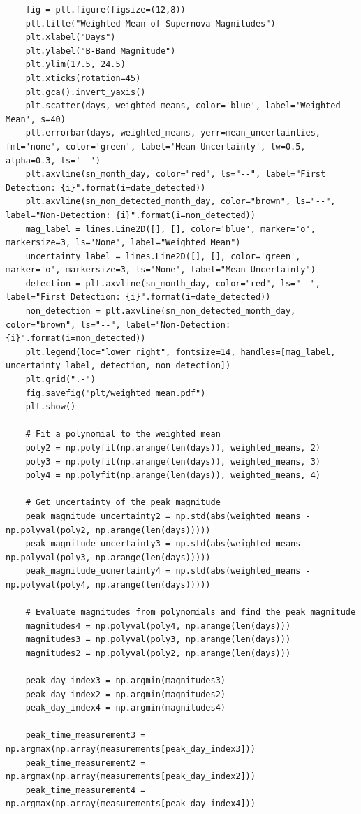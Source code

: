 \documentclass{article}
\begin{document}
\begin{appendices}
\begin{verbatim}
    fig = plt.figure(figsize=(12,8))
    plt.title("Weighted Mean of Supernova Magnitudes")
    plt.xlabel("Days")
    plt.ylabel("B-Band Magnitude")
    plt.ylim(17.5, 24.5)
    plt.xticks(rotation=45)
    plt.gca().invert_yaxis()
    plt.scatter(days, weighted_means, color='blue', label='Weighted Mean', s=40)
    plt.errorbar(days, weighted_means, yerr=mean_uncertainties, fmt='none', color='green', label='Mean Uncertainty', lw=0.5, alpha=0.3, ls='--')
    plt.axvline(sn_month_day, color="red", ls="--", label="First Detection: {i}".format(i=date_detected))
    plt.axvline(sn_non_detected_month_day, color="brown", ls="--", label="Non-Detection: {i}".format(i=non_detected))
    mag_label = lines.Line2D([], [], color='blue', marker='o', markersize=3, ls='None', label="Weighted Mean")
    uncertainty_label = lines.Line2D([], [], color='green', marker='o', markersize=3, ls='None', label="Mean Uncertainty")
    detection = plt.axvline(sn_month_day, color="red", ls="--", label="First Detection: {i}".format(i=date_detected))
    non_detection = plt.axvline(sn_non_detected_month_day, color="brown", ls="--", label="Non-Detection: {i}".format(i=non_detected))
    plt.legend(loc="lower right", fontsize=14, handles=[mag_label, uncertainty_label, detection, non_detection])
    plt.grid(".-")
    fig.savefig("plt/weighted_mean.pdf")
    plt.show()
    
    # Fit a polynomial to the weighted mean
    poly2 = np.polyfit(np.arange(len(days)), weighted_means, 2)
    poly3 = np.polyfit(np.arange(len(days)), weighted_means, 3)
    poly4 = np.polyfit(np.arange(len(days)), weighted_means, 4)
    
    # Get uncertainty of the peak magnitude
    peak_magnitude_uncertainty2 = np.std(abs(weighted_means - np.polyval(poly2, np.arange(len(days)))))
    peak_magnitude_uncertainty3 = np.std(abs(weighted_means - np.polyval(poly3, np.arange(len(days)))))
    peak_magnitude_ucnertainty4 = np.std(abs(weighted_means - np.polyval(poly4, np.arange(len(days)))))
    
    # Evaluate magnitudes from polynomials and find the peak magnitude
    magnitudes4 = np.polyval(poly4, np.arange(len(days)))
    magnitudes3 = np.polyval(poly3, np.arange(len(days)))
    magnitudes2 = np.polyval(poly2, np.arange(len(days)))
    
    peak_day_index3 = np.argmin(magnitudes3)
    peak_day_index2 = np.argmin(magnitudes2)
    peak_day_index4 = np.argmin(magnitudes4)
    
    peak_time_measurement3 = np.argmax(np.array(measurements[peak_day_index3]))
    peak_time_measurement2 = np.argmax(np.array(measurements[peak_day_index2]))
    peak_time_measurement4 = np.argmax(np.array(measurements[peak_day_index4]))
    

\end{verbatim}
\end{appendices}
\end{document}
